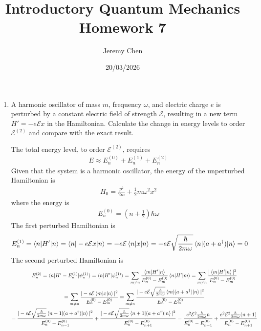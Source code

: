 \documentclass[10pt,letterpaper]{article}
\title{Introductory Quantum Mechanics Homework 7}
\author{Jeremy Chen}
\date{20/03/2026}
\begin{document}
	\maketitle

\begin{enumerate}

\item A harmonic oscillator of mass $m$, frequency $\omega$, and electric charge $e$ is perturbed by a constant electric field of strength $\mathcal{E}$, resulting in a new term $H' = -e\mathcal{E}x$ in the Hamiltonian. Calculate the change in energy levels to order $\mathcal{E}^{(2)}$ and compare with the exact result. 

\color{violet}
The total energy level, to order $\mathcal{E}^{(2)}$, requires
\begin{gather*}
E \approx E_{n}^{(0)} + E_{n}^{(1)} + E_{n}^{(2)}
\end{gather*}
Given that the system is a harmonic oscillator, the energy of the unperturbed Hamiltonian is
\begin{gather*}
H_{0} = \frac{p^{2}}{2m} + \frac{1}{2}m\omega^{2}x^{2}
\end{gather*}
where the energy is
\begin{gather*}
E_{n}^{(0)} = \left( n + \frac{1}{2} \right)\hbar\omega
\end{gather*}
The first perturbed Hamiltonian is
\begin{gather*}
E_{n}^{(1)} = \braket{n | H' | n} = \braket{n | -e\mathcal{E}x | n} = -e\mathcal{E}\braket{n | x | n} = -e\mathcal{E}\sqrt{\frac{\hbar}{2m\omega}} \braket{n | (a + a^{\dagger}) | n} = 0
\end{gather*}
The second perturbed Hamiltonian is
\begin{gather*}
E_{n}^{(2)} = \braket{n | H' - E_{n}^{(1)} | \psi_{n}^{(1)}} = \braket{n | H' | \psi_{n}^{(1)}} = \sum_{m \neq n} \frac{\braket{m | H' | n}}{E_{n}^{(0)} - E_{m}^{(0)}}\braket{n | H' | m} = \sum_{m \neq n} \frac{|\braket{m | H' | n}|^{2}}{E_{n}^{(0)} - E_{m}^{(0)}} \\
= \sum_{m \neq n} \frac{|-e\mathcal{E}\braket{m | x | n}|^{2}}{E_{n}^{(0)} - E_{m}^{(0)}} = \sum_{m \neq n} \frac{|-e\mathcal{E}\sqrt{\frac{\hbar}{2m\omega}}\braket{m | (a + a^{\dagger}) | n}|^{2}}{E_{n}^{(0)} - E_{m}^{(0)}} \\
= \frac{|-e\mathcal{E}\sqrt{\frac{\hbar}{2m\omega}}\braket{n - 1 | (a + a^{\dagger}) | n}|^{2}}{E_{n}^{(0)} - E_{n - 1}^{(0)}} + \frac{|-e\mathcal{E}\sqrt{\frac{\hbar}{2m\omega}}\braket{n + 1 | (a + a^{\dagger}) | n}|^{2}}{E_{n}^{(0)} - E_{n + 1}^{(0)}} = \frac{e^{2}\mathcal{E}^{2}\frac{\hbar}{2m\omega}n}{E_{n}^{(0)} - E_{n - 1}^{(0)}} + \frac{e^{2}\mathcal{E}^{2}\frac{\hbar}{2m\omega}(n + 1)}{E_{n}^{(0)} - E_{n + 1}^{(0)}} \\

\end{gather*}
\end{enumerate}
\end{document}
